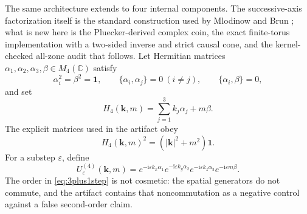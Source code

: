 \documentclass[11pt]{article}
\newcommand{\ii}{\mathrm{i}}
\newcommand{\C}{\mathbb{C}}
\newcommand{\id}{\mathbf{1}}
\begin{document}
The same architecture extends to four internal components.  The
successive-axis factorization itself is the standard construction used by
Mlodinow and Brun \cite{MlodinowBrun}; what is new here is the
Pluecker-derived complex coin, the exact finite-torus implementation with a
two-sided inverse and strict causal cone, and the kernel-checked all-zone
audit that follows.  Let Hermitian
matrices $\alpha_1,\alpha_2,\alpha_3,\beta\in M_4(\C)$ satisfy
\[
 \alpha_i^2=\beta^2=\id,
 \qquad \{\alpha_i,\alpha_j\}=0\ (i\neq j),
 \qquad \{\alpha_i,\beta\}=0,
\]
and set
\[
 H_4(\mathbf k,m)=\sum_{j=1}^3k_j\alpha_j+m\beta.
\]
The explicit matrices used in the artifact obey
\begin{equation}\label{eq:H4square}
 H_4(\mathbf k,m)^2=(|\mathbf k|^2+m^2)\id.
\end{equation}
For a substep $\varepsilon$, define
\begin{equation}\label{eq:3plus1step}
 U^{(4)}_\varepsilon(\mathbf k,m)
 =e^{-\ii\varepsilon k_x\alpha_1}
  e^{-\ii\varepsilon k_y\alpha_2}
  e^{-\ii\varepsilon k_z\alpha_3}
  e^{-\ii\varepsilon m\beta}.
\end{equation}
The order in \eqref{eq:3plus1step} is not cosmetic: the spatial generators do
not commute, and the artifact contains that noncommutation as a negative
control against a false second-order claim.
\end{document}
